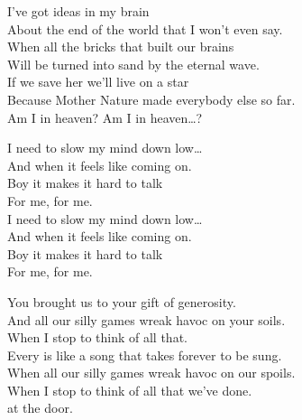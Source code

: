 I've got ideas in my brain \\
About the end of the world that I won't even say. \\
When all the bricks that built our brains \\
Will be turned into sand by the eternal wave. \\
If we save her we'll live on a star \\
Because Mother Nature made everybody else so far. \\

Am I in heaven? Am I in heaven…?





I need to slow my mind down low… \\

And when it feels like coming on. \\
Boy it makes it hard to talk \\
For me, for me. \\

I need to slow my mind down low… \\

And when it feels like coming on. \\
Boy it makes it hard to talk \\
For me, for me. \\





You brought us to your gift of generosity. \\
And all our silly games wreak havoc on your soils. \\
When I stop to think of all that. \\

Every  is like a song that takes forever to be sung. \\
When all our silly games wreak havoc on our spoils. \\
When I stop to think of all that we've done. \\
 at the door. \\


